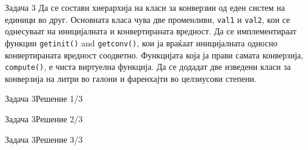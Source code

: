 \begin{frame}{Задача 3}
    Да  се  состави хиерархија на  класи  за  конверзии од  еден  систем на 
    единици  во  друг. Основната класа чува две променливи, \texttt{val1} и \texttt{val2}, кои се
    однесуваат на иницијалната и конвертираната вредност. Да се имплементираат
    функции \texttt{getinit()} and \texttt{getconv()}, кои ја враќаат  иницијалната  односно 
    конвертираната  вредност  соодветно. Функцијата која ја прави самата
    конверзија, \texttt{compute()}, е чиста виртуелна функција. Да се  додадат две
    изведени класи за конверзија на литри во галони и фаренхајти во целзиусови
    степени.
\end{frame}


\begin{frame}[fragile]{Задача 3}{Решение 1/3}

\end{frame}

\begin{frame}[fragile]{Задача 3}{Решение 2/3}

\end{frame}

\begin{frame}[fragile]{Задача 3}{Решение 3/3}

\end{frame}

